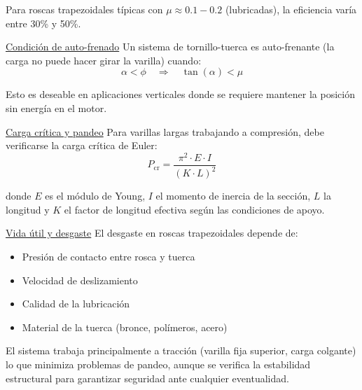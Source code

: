Para roscas trapezoidales típicas con $\mu \approx 0.1-0.2$ (lubricadas), la eficiencia varía entre 30\% y 50\%.

\underline{Condición de auto-frenado}
Un sistema de tornillo-tuerca es auto-frenante (la carga no puede hacer girar la varilla) cuando:
\begin{equation}
    \alpha < \phi \quad \Rightarrow \quad \tan(\alpha) < \mu
\end{equation}

Esto es deseable en aplicaciones verticales donde se requiere mantener la posición sin energía en el motor.

\underline{Carga crítica y pandeo}
Para varillas largas trabajando a compresión, debe verificarse la carga crítica de Euler:
\begin{equation}
    P_{\text{cr}} = \frac{\pi^2 \cdot E \cdot I}{(K \cdot L)^2}
\end{equation}

donde $E$ es el módulo de Young, $I$ el momento de inercia de la sección, $L$ la longitud y $K$ el factor de longitud efectiva según las condiciones de apoyo.

\underline{Vida útil y desgaste}
El desgaste en roscas trapezoidales depende de:
\begin{itemize}[label=$\bullet$]
    \item Presión de contacto entre rosca y tuerca
    \item Velocidad de deslizamiento
    \item Calidad de la lubricación
    \item Material de la tuerca (bronce, polímeros, acero)
\end{itemize}

El sistema trabaja principalmente a tracción (varilla fija superior, carga colgante) lo que minimiza problemas de pandeo, aunque se verifica la estabilidad estructural para garantizar seguridad ante cualquier eventualidad.
